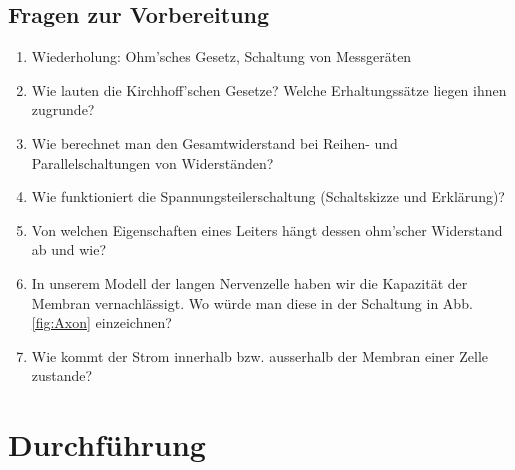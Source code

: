 \begin{tutorhint}
\section{Fragen zur Vorbereitung}

\begin{enumerate} 
	\item Wiederholung: Ohm'sches Gesetz, Schaltung von Messgeräten
	\item Wie lauten die Kirchhoff'schen Gesetze? Welche Erhaltungssätze liegen ihnen zugrunde?
	\item Wie berechnet man den Gesamtwiderstand bei Reihen- und Parallelschaltungen von Widerständen?
	\item Wie funktioniert die Spannungsteilerschaltung (Schaltskizze und Erklärung)? 
	\item Von welchen Eigenschaften eines Leiters hängt dessen ohm'scher Widerstand ab und wie?
	\item In unserem Modell der langen Nervenzelle haben wir die Kapazität der Membran vernachlässigt. Wo würde man diese in der Schaltung in Abb. \ref{fig:Axon} einzeichnen?
	\item Wie kommt der Strom innerhalb bzw. ausserhalb der Membran einer Zelle zustande?
\end{enumerate} 

\end{tutorhint}

\section{Durchführung} 
